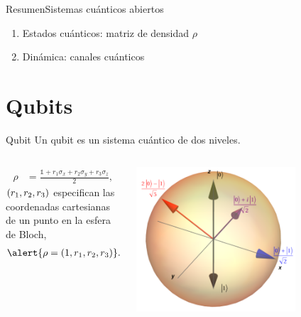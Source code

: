 \documentclass[xcolor=dvipsnames,presentation]{beamer}%
\begin{document}
\begin{frame}{Resumen}{Sistemas cuánticos abiertos}
	\begin{enumerate}
		\item Estados cuánticos: matriz de densidad $\rho$
		\item Dinámica: canales cuánticos
	\end{enumerate}
\end{frame}


\section{Qubits}

\begin{frame}{Qubit}
	Un qubit es un sistema cuántico de dos niveles.
	
	\begin{columns}
	\hspace{1cm}
	\begin{column}{0.7\textwidth}
		\begin{align*}
			\rho &= \frac{\mathds{1}+r_1\sigma_x+r_2\sigma_y+r_3\sigma_z}{2},
		\end{align*}	
		$\qty(r_1,r_2,r_3)$ especifican las coordenadas cartesianas de un 
 		punto en la esfera de Bloch,
 	\begin{align*}
 		\alert{\rho = \qty(1,r_1,r_2,r_3)}.
 	\end{align*}
	\end{column}\hspace{-1cm}
	\begin{column}{0.5\textwidth}  
  		\begin{center}
    		\includegraphics[width=0.7\textwidth]{bloch-sph}      
     \end{center}
		\end{column}
	\end{columns}
\end{frame}
\end{document}
